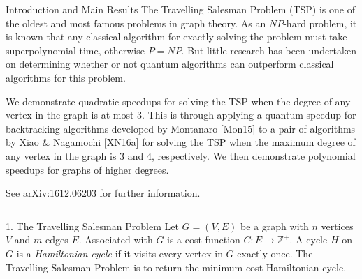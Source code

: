 \documentclass[]{templates/poster}
\begin{document}

\begin{frame}{} 

\begin{columns}[t]
  \begin{column}{0.900\linewidth}
  \begin{block}{\Large Introduction and Main Results}
  The Travelling Salesman Problem (TSP) is one of the oldest and most famous problems in graph theory. As an $NP$-hard problem, it is known that any classical algorithm for exactly solving the problem must take superpolynomial time, otherwise $P = NP$. But little research has been undertaken on determining whether or not quantum algorithms can outperform classical algorithms for this problem.
  
  We demonstrate quadratic speedups for solving the TSP when the degree of any vertex in the graph is at most $3$. This is through applying a quantum speedup for backtracking algorithms developed by Montanaro [Mon15] to a pair of algorithms by Xiao \& Nagamochi [XN16a] for solving the TSP when the maximum degree of any vertex in the graph is $3$ and $4$, respectively. We then demonstrate polynomial speedups for graphs of higher degrees. 
  
  See arXiv:1612.06203 for further information.
  \end{block}
  \end{column}
\end{columns}

\begin{columns}[t]
  \begin{column}{0.422\linewidth}
  \begin{block}{\Large 1. The Travelling Salesman Problem}
  Let $G = (V, E)$ be a graph with $n$ vertices $V$ and $m$ edges $E$. Associated with $G$ is a cost function $C \colon E \rightarrow \mathbb{Z}^+$. A cycle $H$ on $G$ is a {\em Hamiltonian cycle} if it visits every vertex in $G$ exactly once. The Travelling Salesman Problem is to return the minimum cost Hamiltonian cycle.
  

\end{block}
\end{column}
\end{columns}
\end{frame}
\end{document}
